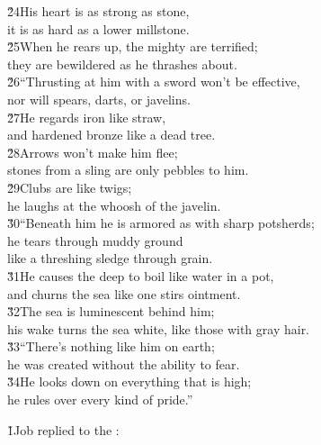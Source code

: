 \begin{poetry}
\poeml \v{24}His heart is as strong as stone, \\
\poemll    it is as hard as a lower millstone. \\
\poeml \v{25}When he rears up, the mighty are terrified; \\
\poemll    they are bewildered as he thrashes about. \\
\poeml \v{26}``Thrusting at him with a sword won't be effective, \\
\poemll    nor will spears, darts, or javelins. \\
\poeml \v{27}He regards iron like straw, \\
\poemll    and hardened bronze like a dead tree. \\
\poeml \v{28}Arrows won't make him flee; \\
\poemll    stones from a sling are only pebbles to him. \\
\poeml \v{29}Clubs are like twigs; \\
\poemll    he laughs at the whoosh of the javelin. \\
\poeml \v{30}``Beneath him he is armored as with sharp potsherds; \\
\poemll    he tears through muddy ground \\
\poemlll       like a threshing sledge through grain. \\
\poeml \v{31}He causes the deep to boil like water in a pot, \\
\poemll    and churns the sea like one stirs ointment. \\
\poeml \v{32}The sea is luminescent behind him; \\
\poemll    his wake turns the sea white, like those with gray hair. \\
\poeml \v{33}``There's nothing like him on earth; \\
\poemll    he was created without the ability to fear. \\
\poeml \v{34}He looks down on everything that is high; \\
\poemll    he rules over every kind of pride.''
\end{poetry}

\v{1}Job replied to the :

